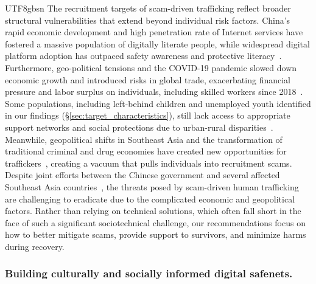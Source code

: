\documentclass[sigconf,nonacm]{acmart}
\newcommand{\rev}[1]{#1}
\newcommand{\add}[1]{#1}
\begin{document}
\begin{CJK}{UTF8}{gbsn}
The recruitment targets of scam-driven trafficking reflect broader structural vulnerabilities that extend beyond individual risk factors. China's rapid economic development and high penetration rate of Internet services have fostered a massive population of digitally literate people, while widespread digital platform adoption has outpaced safety awareness and protective literacy~\cite{creemers2022china}. Furthermore, geo-political tensions and the COVID-19 pandemic slowed down economic growth and introduced risks in global trade, exacerbating financial pressure and labor surplus on individuals, including skilled workers since 2018~\cite{mckibbin2023global, alessandria2025trade}. Some populations, including left-behind children and unemployed youth identified in our findings (\S\ref{sec:target_characteristics}), still lack access to appropriate support networks and social protections due to urban-rural disparities~\cite{hung2025practice}. Meanwhile, geopolitical shifts in Southeast Asia and the transformation of traditional criminal and drug economies have created new opportunities for traffickers~\cite{jesperson2023trafficking}, creating a vacuum that pulls individuals into recruitment scams. Despite joint efforts between the Chinese government and several affected Southeast Asia countries~\cite{ho2025china}, the threats posed by scam-driven human trafficking are challenging to eradicate due to the complicated economic and geopolitical factors. \add{Rather than relying on technical solutions, which often fall short in the face of such a significant sociotechnical challenge, our recommendations focus on how to better mitigate scams, provide support to survivors, and minimize harms during recovery.}

\subsubsection{\rev{Building culturally and socially informed digital safenets.}}


\end{CJK}
\end{document}
